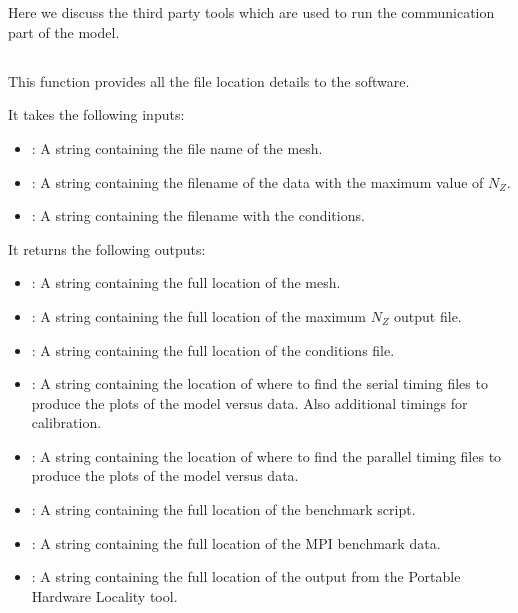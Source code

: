 
\chapter{} %

\label{Chapter5} %

Here we discuss the third party tools which are used to run the communication part of the model.

\section{}
This function provides all the file location details to the software.

It takes the following inputs:

\begin{itemize}
\item {}: A string containing the file name of the mesh.
\item {}: A string containing the filename of the data with the maximum value of \(N_Z\).
\item {}: A string containing the filename with the conditions.
\end{itemize}

It returns the following outputs:

\begin{itemize}
\item {}: A string containing the full location of the mesh.
\item {}: A string containing the full location of the maximum \(N_Z\) output file.
\item {}: A string containing the full location of the conditions file.
\item {}: A string containing the location of where to find the serial timing files to produce the plots of the model versus data. Also additional timings for calibration.
\item {}: A string containing the location of where to find the parallel timing files to produce the plots of the model versus data.
\item {}: A string containing the full location of the benchmark  script.
\item {}: A string containing the full location of the MPI benchmark data.
\item {}: A string containing the full location of the  output from the Portable Hardware Locality tool.
\end{itemize}

